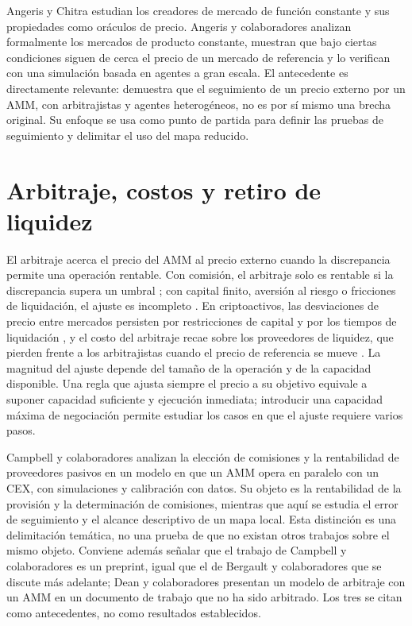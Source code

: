 Angeris y Chitra \cite{angeris2020cfmm} estudian los creadores de mercado de función constante y sus propiedades como oráculos de precio. Angeris y colaboradores \cite{angeris2020uniswap} analizan formalmente los mercados de producto constante, muestran que bajo ciertas condiciones siguen de cerca el precio de un mercado de referencia y lo verifican con una simulación basada en agentes a gran escala. El antecedente es directamente relevante: demuestra que el seguimiento de un precio externo por un AMM, con arbitrajistas y agentes heterogéneos, no es por sí mismo una brecha original. Su enfoque se usa como punto de partida para definir las pruebas de seguimiento y delimitar el uso del mapa reducido.

\section{Arbitraje, costos y retiro de liquidez}

El arbitraje acerca el precio del AMM al precio externo cuando la discrepancia permite una operación rentable. Con comisión, el arbitraje solo es rentable si la discrepancia supera un umbral \cite{milionis2025fees}; con capital finito, aversión al riesgo o fricciones de liquidación, el ajuste es incompleto \cite{shleifer1997limits}. En criptoactivos, las desviaciones de precio entre mercados persisten por restricciones de capital y por los tiempos de liquidación \cite{makarov2020trading,hautsch2024building}, y el costo del arbitraje recae sobre los proveedores de liquidez, que pierden frente a los arbitrajistas cuando el precio de referencia se mueve \cite{milionis2022lvr}. La magnitud del ajuste depende del tamaño de la operación y de la capacidad disponible. Una regla que ajusta siempre el precio a su objetivo equivale a suponer capacidad suficiente y ejecución inmediata; introducir una capacidad máxima de negociación permite estudiar los casos en que el ajuste requiere varios pasos.

Campbell y colaboradores \cite{campbell2025optimal} analizan la elección de comisiones y la rentabilidad de proveedores pasivos en un modelo en que un AMM opera en paralelo con un CEX, con simulaciones y calibración con datos. Su objeto es la rentabilidad de la provisión y la determinación de comisiones, mientras que aquí se estudia el error de seguimiento y el alcance descriptivo de un mapa local. Esta distinción es una delimitación temática, no una prueba de que no existan otros trabajos sobre el mismo objeto. Conviene además señalar que el trabajo de Campbell y colaboradores es un preprint, igual que el de Bergault y colaboradores \cite{bergault2025exit} que se discute más adelante; Dean y colaboradores \cite{dean2022arbitrage} presentan un modelo de arbitraje con un AMM en un documento de trabajo que no ha sido arbitrado. Los tres se citan como antecedentes, no como resultados establecidos.

